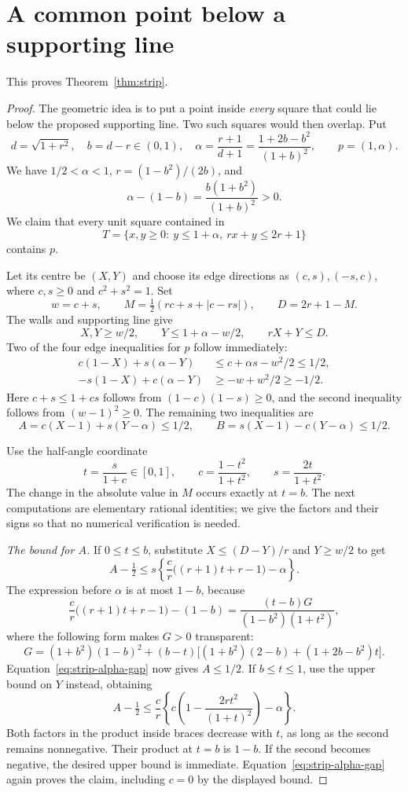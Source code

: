 \documentclass[11pt]{article}
\begin{document}
\section{A common point below a supporting line}\label{app:strip-proof}
This proves Theorem~\ref{thm:strip}.
\begin{proof}
The geometric idea is to put a point inside \emph{every} square that
could lie below the proposed supporting line. Two such squares would
then overlap. Put
\[
 d=\sqrt{1+r^2},\quad b=d-r\in(0,1),\quad
 \alpha=\frac{r+1}{d+1}
 =\frac{1+2b-b^2}{(1+b)^2},\qquad p=(1,\alpha).
\]
We have $1/2<\alpha<1$, $r=(1-b^2)/(2b)$, and
\begin{equation}\label{eq:strip-alpha-gap}
 \alpha-(1-b)=\frac{b(1+b^2)}{(1+b)^2}>0.
\end{equation}
We claim that every unit square contained in
\[
 T=\{x,y\ge0:\ y\le1+\alpha,\ rx+y\le2r+1\}
\]
contains $p$.

Let its centre be $(X,Y)$ and choose its edge directions as
$(c,s),(-s,c)$, where $c,s\ge0$ and $c^2+s^2=1$. Set
\[
 w=c+s,\qquad
 M=\tfrac12(rc+s+|c-rs|),\qquad D=2r+1-M.
\]
The walls and supporting line give
\begin{equation}\label{eq:strip-centre}
 X,Y\ge w/2,\qquad Y\le1+\alpha-w/2,\qquad rX+Y\le D.
\end{equation}
Two of the four edge inequalities for $p$ follow immediately:
\begin{align*}
 c(1-X)+s(\alpha-Y)&\le c+\alpha s-w^2/2\le1/2,\\
 -s(1-X)+c(\alpha-Y)&\ge-w+w^2/2\ge-1/2.
\end{align*}
Here $c+s\le1+cs$ follows from $(1-c)(1-s)\ge0$, and the
second inequality follows from $(w-1)^2\ge0$.
The remaining two inequalities are
\[
 A=c(X-1)+s(Y-\alpha)\le1/2,\qquad
 B=s(X-1)-c(Y-\alpha)\le1/2.
\]

Use the half-angle coordinate
\[
 t=\frac{s}{1+c}\in[0,1],\qquad
 c=\frac{1-t^2}{1+t^2},\qquad s=\frac{2t}{1+t^2}.
\]
The change in the absolute value in $M$ occurs exactly at $t=b$.
The next computations are elementary rational identities; we give the
factors and their signs so that no numerical verification is needed.

\emph{The bound for $A$.}
If $0\le t\le b$, substitute $X\le(D-Y)/r$ and $Y\ge w/2$ to get
\[
 A-\tfrac12\le s\left\{\frac c r\bigl((r+1)t+r-1\bigr)-\alpha\right\}.
\]
The expression before $\alpha$ is at most $1-b$, because
\[
 \frac c r\bigl((r+1)t+r-1\bigr)-(1-b)
 =\frac{(t-b)G}{(1-b^2)(1+t^2)},
\]
where the following form makes $G>0$ transparent:
\[
 G=(1+b^2)(1-b)^2
 +(b-t)\bigl[(1+b^2)(2-b)+(1+2b-b^2)t\bigr].
\]
Equation~\eqref{eq:strip-alpha-gap} now gives $A\le1/2$.
If $b\le t\le1$, use the upper bound on $Y$ instead, obtaining
\[
 A-\tfrac12\le\frac c r
 \left\{c\left(1-\frac{2rt^2}{(1+t)^2}\right)-\alpha\right\}.
\]
Both factors in the product inside braces decrease with $t$, as long
as the second remains nonnegative. Their product at $t=b$ is $1-b$.
If the second becomes negative, the desired upper bound is immediate.
Equation~\eqref{eq:strip-alpha-gap} again proves the claim, including
$c=0$ by the displayed bound.


\end{proof}
\end{document}
